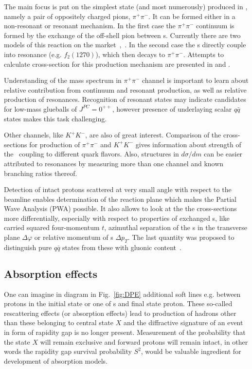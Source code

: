 The main focus is put on the simplest state (and most numerously) produced in \DPE, namely a pair of oppositely charged pions, $\pi^{+}\pi^{-}$. It can be formed either in a non-resonant or resonant mechanism. In the first case the $\pi^{+}\pi^{-}$ continuum is formed by the exchange of the off-shell pion between \Pomeron s. Currently there are two models of this reaction on the market~\cite{LSmodel,LSmodel2},~\cite{DurhamModel}. In the second case the \Pomeron s directly couple into resonance (e.g. $f_{2}(1270)$), which then decays to $\pi^{+}\pi^{-}$. Attempts to calculate cross-section for this production mechanism are presented in \cite{LSmodel2} and \cite{Schicker}.

Understanding of the mass spectrum in $\pi^{+}\pi^{-}$ channel is important to learn about relative contribution from continuum and resonant production, as well as relative production of resonances. Recognition of resonant states may indicate candidates for low-mass glueballs of $J^{PC}=0^{++}$, however presence of underlaying scalar $q\bar{q}$ states makes this task challenging.

Other channels, like $K^{+}K^{-}$, are also of great interest. Comparison of the cross-sections for production of $\pi^{+}\pi^{-}$ and $K^{+}K^{-}$ gives information about strength of the \Pomeron\ coupling to different quark flavors. Also, structures in $d\sigma/dm$ can be easier attributed to resonances by measuring more than one channel and known branching ratios thereof.

Detection of intact protons scattered at very small angle with respect to the beamline enables determination of the reaction plane which makes the Partial Wave Analysis (PWA) possible. It also allows to look at the the cross-sections more differentially, especially with respect to properties of exchanged \Pomeron s, like carried squared four-momentum $t$, azimuthal separation of the \Pomeron s in the transverse plane $\Delta\varphi$ or relative momentum of \Pomeron s $\Delta p_{T}$. The last quantity was proposed to distinguish pure $q\bar{q}$ states from these with gluonic content~\cite{DPtFilter}.

\subsection{Absorption effects}

One can imagine in diagram in Fig.~\ref{fig:DPE} additional soft lines e.g. between protons in the initial state or one of \Pomeron s and final state proton. These so-called rescattering effects (or absorption effects) lead to production of hadrons other than these belonging to central state $X$ and the diffractive signature of an event in form of rapidity gap is no longer present. Measurement of the probability that the state $X$ will remain exclusive and forward protons will remain intact, in other words the rapidity gap survival probability $S^{2}$, would be valuable ingredient for development of absorption models.

